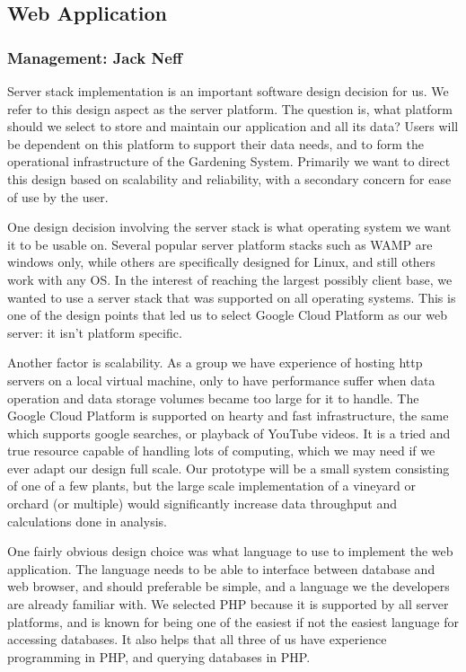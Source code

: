 \documentclass[IEEEtran,letterpaper,10pt,titlepage,fleqn,draftclsnofoot,onecolumn]{article}
\begin{document}
\subsection{Web Application}
\subsubsection{Management: Jack Neff}

Server stack implementation is an important software design decision for us. We refer to this design aspect as the server platform. The question is, what platform should we select to store and maintain our application and all its data? Users will be dependent on this platform to support their data needs, and to form the operational infrastructure of the Gardening System. Primarily we want to direct this design based on scalability and reliability, with a secondary concern for ease of use by the user. 

One design decision involving the server stack is what operating system we want it to be usable on. Several popular server platform stacks such as WAMP are windows only, while others are specifically designed for Linux, and still others work with any OS. In the interest of reaching the largest possibly client base, we wanted to use a server stack that was supported on all operating systems. This is one of the design points that led us to select Google Cloud Platform as our web server: it isn’t platform specific.

Another factor is scalability. As a group we have experience of hosting http servers on a local virtual machine, only to have performance suffer when data operation and data storage volumes became too large for it to handle. The Google Cloud Platform is supported on hearty and fast infrastructure, the same which supports google searches, or playback of YouTube videos. It is a tried and true resource capable of handling lots of computing, which we may need if we ever adapt our design full scale. Our prototype will be a small system consisting of one of a few plants, but the large scale implementation of a vineyard or orchard (or multiple) would significantly increase data throughput and calculations done in analysis. 

One fairly obvious design choice was what language to use to implement the web application. The language needs to be able to interface between database and web browser, and should preferable be simple, and a language we the developers are already familiar with. We selected PHP because it is supported by all server platforms, and is known for being one of the easiest if not the easiest language for accessing databases. It also helps that all three of us have experience programming in PHP, and querying databases in PHP. 
\end{document}

